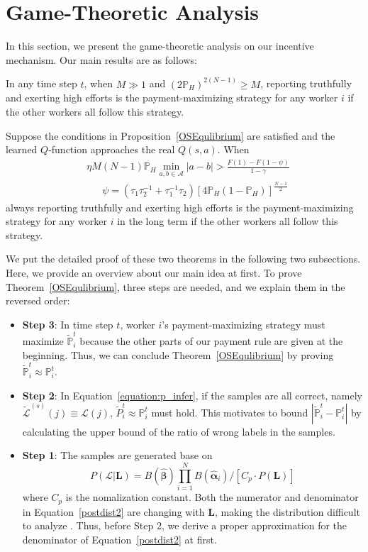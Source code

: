 \section{Game-Theoretic Analysis}
\label{analysis}
In this section, we present the game-theoretic analysis on our incentive mechanism. Our main results are as follows:
\begin{theorem}
\label{OSEqulibrium}
In any time step $t$, when $M\gg 1$ and $(2\mathbb{P}_H)^{2(N-1)} \geq M$, reporting truthfully and exerting high efforts is the payment-maximizing strategy for any worker $i$ if the other workers all follow this strategy.
\end{theorem}
\begin{theorem}
\label{RMNE}
Suppose the conditions in Proposition~\ref{OSEqulibrium} are satisfied and the learned $Q$-function approaches the real $Q(s,a)$. When
\begin{align}
&\eta M(N-1)\mathbb{P}_H \min_{a,b\in\mathcal{A}}|a-b|> \frac{F(1)-F(1-\psi)}{1-\gamma}\label{Condition}\\
&\quad\;\;\psi =(\tau_1\tau_2^{-1}+\tau_1^{-1}\tau_2)[4\mathbb{P}_H(1-\mathbb{P}_H)]^{\frac{N-1}{2}}
\end{align}
always reporting truthfully and exerting high efforts is the payment-maximizing strategy for any worker $i$ in the long term if the other workers all follow this strategy.
\end{theorem}
We put the detailed proof of these two theorems in the following two subsections. Here, we provide an overview about our main idea at first.
To prove Theorem~\ref{OSEqulibrium}, three steps are needed, and we explain them in the reversed order:
\begin{itemize}
\item \textbf{Step 3}: In time step $t$, worker $i$'s payment-maximizing strategy must maximize $\tilde{\mathbb{P}}^t_i$ because the other parts of our payment rule are given at the beginning.
Thus, we can conclude Theorem~\ref{OSEqulibrium} by proving $\tilde{\mathbb{P}}^t_i\approx \mathbb{P}^t_i$.
\item \textbf{Step 2}: In Equation~\ref{equation:p_infer}, if the samples are all correct, namely $\tilde{\mathcal{L}}^{(s)}(j)\equiv\mathcal{L}(j)$, $\tilde{P}^t_i\approx \mathbb{P}^t_i$ must hold. This motivates to bound $|\tilde{\mathbb{P}}^t_i-\mathbb{P}^t_i|$ by calculating the upper bound of the ratio of wrong labels in the samples.
\item \textbf{Step 1}: The samples are generated base on 
\begin{equation}
\label{postdist2}
P(\mathcal{L}|\bm{L})=B(\hat{\bm{\beta}}){\prod}_{i=1}^{N}B(\hat{\bm{\alpha}}_{i})/[C_p\cdot P(\bm{L})]
\end{equation}
where $C_p$ is the nomalization constant. Both the numerator and denominator in Equation~\ref{postdist2} are changing with $\bm{L}$, making the distribution difficult to analyze . Thus, before Step 2, we derive a proper approximation for the denominator of Equation~\ref{postdist2} at first.
\end{itemize}

